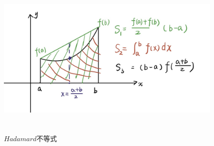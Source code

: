 \begin{figure}[htbp]
	\centering
	\includegraphics[width=15cm,height=8cm]{"figure/Summary/阿达玛不等式.jpg"}
	\caption{$Hadamard$不等式}
	\label{Figure: 阿达玛不等式}
\end{figure}

